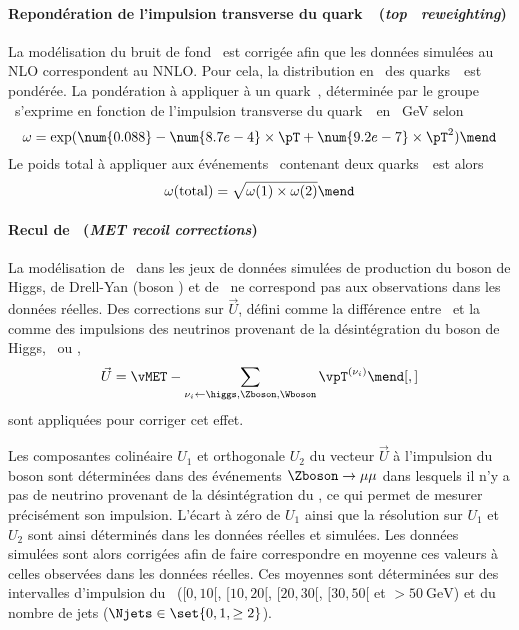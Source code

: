\paragraph{Repondération de l'impulsion transverse du quark~\quarkt\ (\emph{top \pT\ reweighting})}
La modélisation du bruit de fond \ttbar\ est corrigée afin que les données simulées au NLO correspondent au NNLO.
Pour cela, la distribution en \pT\ des quarks~\quarkt\ est pondérée.
La pondération à appliquer à un quark~\quarkt, déterminée par le groupe \quarkt\antiquarkt\Higgs\ s'exprime en fonction de l'impulsion transverse du quark~\quarkt\ en \SI{}{\GeV} selon
\begin{equation}
\omega = \exp(\num{0.088} - \num{8.7e-4}\times\pT + \num{9.2e-7}\times\pT^2)
\mend
\end{equation}
Le poids total à appliquer aux événements \ttbar\ contenant deux quarks~\quarkt\ est alors
\begin{equation}
\omega(\text{total}) = \sqrt{\omega(1) \times \omega(2)}
\mend
\end{equation}
\paragraph{Recul de \MET\ (\emph{MET recoil corrections})}
La modélisation de \MET\ dans les jeux de données simulées de production du boson de Higgs, de Drell-Yan (boson \Zboson) et de \Wjets\ ne correspond pas aux observations dans les données réelles.
Des corrections sur $\vec{U}$, défini comme la différence entre \MET\ et la comme des impulsions des neutrinos provenant de la désintégration du boson de Higgs, \Zboson\ ou \Wboson, \ie
\begin{equation}
\vec{U} = \vMET - \sum_{\nu_i \leftarrow \higgs,\Zboson,\Wboson} \vpT^{(\nu_i)}
\mend[,]
\end{equation}
sont appliquées pour corriger cet effet.
\par
Les composantes colinéaire $U_1$ et orthogonale $U_2$ du vecteur $\vec{U}$ à l'impulsion du boson sont déterminées dans des événements $\Zboson\to\mu\mu$ dans lesquels il n'y a pas de neutrino provenant de la désintégration du \Zboson, ce qui permet de mesurer précisément son impulsion.
L'écart à zéro de $U_1$ ainsi que la résolution sur $U_1$ et $U_2$ sont ainsi déterminés dans les données réelles et simulées.
Les données simulées sont alors corrigées afin de faire correspondre en moyenne ces valeurs à celles observées dans les données réelles.
Ces moyennes sont déterminées sur des intervalles d'impulsion du \Zboson\ ($[\num{0}, \num{10}[$, $[\num{10}, \num{20}[$, $[\num{20}, \num{30}[$, $[\num{30}, \num{50}[$ et $>\SI{50}{\GeV}$) et du nombre de jets ($\Njets\in\set{0, 1, \geq2}$).
